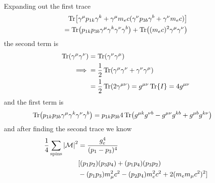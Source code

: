 \documentclass[../main.tex]{subfiles}
\begin{document}
\paragraph*{} Expanding out the first trace
\begin{align*}
    \Tr[\gamma^\mu p_{1k} \gamma^k + \gamma^\mu m_e c (\gamma^\nu p_{3b} \gamma^b + \gamma^\nu m_e c)] \\
    = \Tr(p_{1k} p_{3b} \gamma^\mu \gamma^k \gamma^\nu \gamma^b) + \Tr((m_e c)^2 \gamma^\mu \gamma^\nu)
\end{align*}
the second term is
\begin{align*}
    \Tr(\gamma^\mu \gamma^\nu) &= \Tr(\gamma^\nu \gamma^\mu) \\
    \implies &= \frac{1}{2} \Tr(\gamma^\mu \gamma^\nu + \gamma^\nu \gamma^\mu) \\
    &= \frac{1}{2} \Tr(2 \gamma^{\mu\nu}) = g^{\mu{\nu}} \Tr{I} = 4 g^{\mu\nu}
\end{align*}
and the first term is
\begin{align*}
    \Tr(p_{1k} p_{3b} \gamma^\mu \gamma^k \gamma^\nu \gamma^b) &= p_{1k} p_{3b} 4\Tr(g^{\mu k} g^{\nu b} - g^{\mu \nu} g^{k b} + g^{\mu b} g^{k \nu}) 
\end{align*}
and after finding the second trace we know
\begin{align*}
    \frac{1}{4} \sum_{\text{spins}} \abs{\mathcal{M}}^2 &= \frac{g_e^4}{(p_1 - p_3)^4}  \\
    &[(p_1 p_2)(p_3 p_4) + (p_1 p_4)(p_3 p_2) \\
    & - (p_1 p_3) m_\mu^2 c^2 - (p_2 p_4) m_e^2 c^2 + 2 (m_e m_\mu c^2)^2]
\end{align*}
\end{document}
